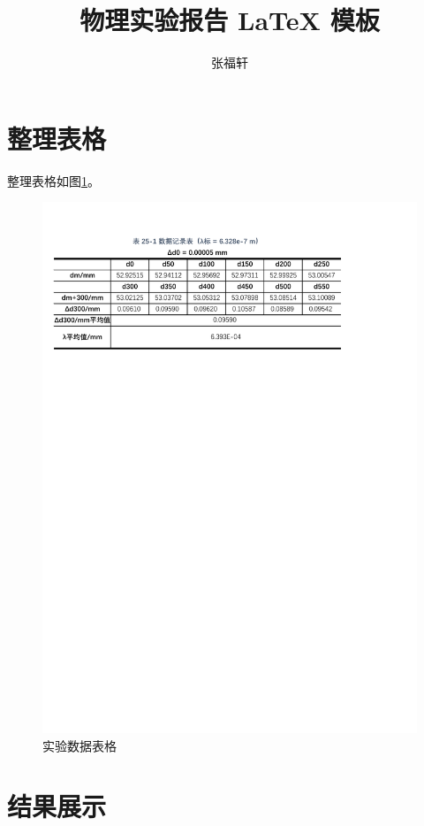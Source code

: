 \documentclass[12pt]{article}
\title{物理实验报告 \LaTeX{} 模板}%
\author{张福轩}
\begin{document}
\maketitle

\section{\normalfont 整理表格}

整理表格如图\ref{fig:table_data}。

\begin{figure}[H] %
    \centering
    \includegraphics[width=\textwidth]{./figures/迈克尔逊.pdf} 
    \caption{实验数据表格}
    \label{fig:table_data}
\end{figure}

\section{\normalfont 结果展示}
\end{document}
